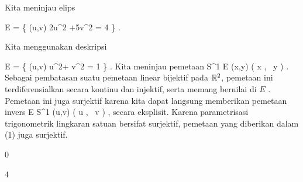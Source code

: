 {

Kita meninjau elips

\mavergleichskettedisp
{\vergleichskette
{ E
}
{ =} { \left\{ (u,v)  \mid   2u^2 +5v^2 = 4         \right\}
}
{ } {
}
{ } {
}
{ } {
}
}
{}{}{.}

}
{

Kita menggunakan deskripsi

\mavergleichskettedisp
{\vergleichskette
{ E
}
{ =} { \left\{ (u,v)   u^2+ {  } v^2 = 1         \right\}
}
{ } {
}
{ } {
}
{ } {
}
}
{}{}{.}
 {Kita meninjau pemetaan
\maabbeledisp {} {S^1} {E
} {(x,y)} { \left(   x  , \,   {  } y                   \right)
} {.}
Sebagai pembatasan suatu pemetaan linear bijektif pada ${\mathbb R}^2$, pemetaan ini terdiferensialkan secara kontinu dan injektif, serta memang bernilai di $E$
 {} {.}
Pemetaan ini juga surjektif karena kita dapat langsung memberikan pemetaan invers
\maabbeledisp {} { E } {S^1
} {(u,v)} { \left(  {  } u  , \,   {  } v                   \right)
} {,}
secara eksplisit. Karena parametrisasi trigonometrik lingkaran satuan bersifat surjektif, pemetaan yang diberikan dalam (1) juga surjektif.
}

 }



{0}

{

}
{  }



{4}

